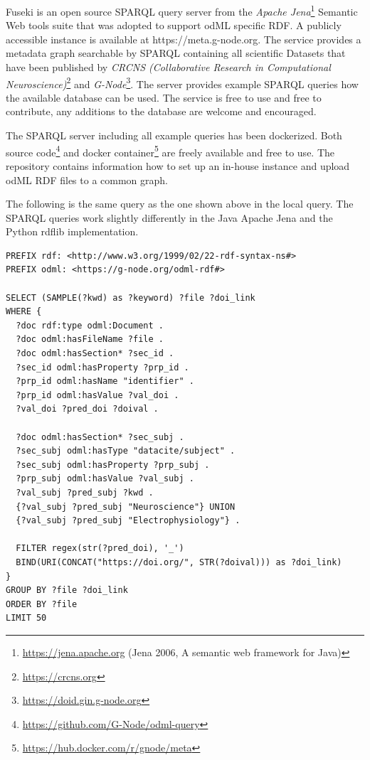 \documentclass{article}
\begin{document}
Fuseki is an open source SPARQL query server from the \textit{Apache Jena}\footnote{\url{https://jena.apache.org} (Jena 2006, A semantic web framework for Java)} Semantic Web tools suite that was adopted to support odML specific RDF. A publicly accessible instance is available at https://meta.g-node.org. The service provides a metadata graph searchable by SPARQL containing all scientific Datasets that have been published by \textit{CRCNS (Collaborative Research in Computational Neuroscience)}\footnote{\url{https://crcns.org}} and \textit{G-Node}\footnote{\url{https://doid.gin.g-node.org}}. The server provides example SPARQL queries how the available database can be used. The service is free to use and free to contribute, any additions to the database are welcome and encouraged.

The SPARQL server including all example queries has been dockerized. Both source code\footnote{\url{https://github.com/G-Node/odml-query}} and docker container\footnote{\url{https://hub.docker.com/r/gnode/meta}} are freely available and free to use. The repository contains information how to set up an in-house instance and upload odML RDF files to a common graph.

The following is the same query as the one shown above in the local query. The SPARQL queries work slightly differently in the Java Apache Jena and the Python rdflib implementation.

\begin{lstlisting}[label=lst:query_server, caption=Example query server, basicstyle=\small]
PREFIX rdf: <http://www.w3.org/1999/02/22-rdf-syntax-ns#>
PREFIX odml: <https://g-node.org/odml-rdf#>

SELECT (SAMPLE(?kwd) as ?keyword) ?file ?doi_link
WHERE {
  ?doc rdf:type odml:Document .
  ?doc odml:hasFileName ?file .
  ?doc odml:hasSection* ?sec_id .
  ?sec_id odml:hasProperty ?prp_id .
  ?prp_id odml:hasName "identifier" .
  ?prp_id odml:hasValue ?val_doi .
  ?val_doi ?pred_doi ?doival .

  ?doc odml:hasSection* ?sec_subj .
  ?sec_subj odml:hasType "datacite/subject" .
  ?sec_subj odml:hasProperty ?prp_subj .
  ?prp_subj odml:hasValue ?val_subj .
  ?val_subj ?pred_subj ?kwd .
  {?val_subj ?pred_subj "Neuroscience"} UNION
  {?val_subj ?pred_subj "Electrophysiology"} .

  FILTER regex(str(?pred_doi), '_')
  BIND(URI(CONCAT("https://doi.org/", STR(?doival))) as ?doi_link)
}
GROUP BY ?file ?doi_link
ORDER BY ?file
LIMIT 50
\end{lstlisting}
\end{document}
